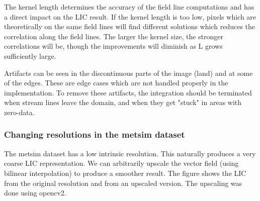 \documentclass{article}
\begin{document}
The kernel length determines the accuracy of the field line computations and has a direct impact on the LIC result.
If the kernel length is too low, pixels which are theoretically on the same field lines will find different solutions which reduces
the correlation along the field lines. The larger the kernel size, the stronger correlations will be, though the improvements will diminish as L grows sufficiently large.

Artifacts can be seen in the discontinuous parts of the image (land) and at some of the edges. These are edge cases which are not handled properly in the implementation.
To remove these artifacts, the integration should be terminated when stream lines leave the domain, and when they get "stuck" in areas with zero-data.


\subsubsection{Changing resolutions in the metsim dataset}
The metsim dataset has a low intrinsic resolution. This naturally produces a very coarse LIC representation. We can arbitrarily upscale
the vector field (using bilinear interpolation) to produce a smoother result. The figure shows the LIC from the original resolution and from an upscaled version.
The upscaling was done using opencv2.
\end{document}

